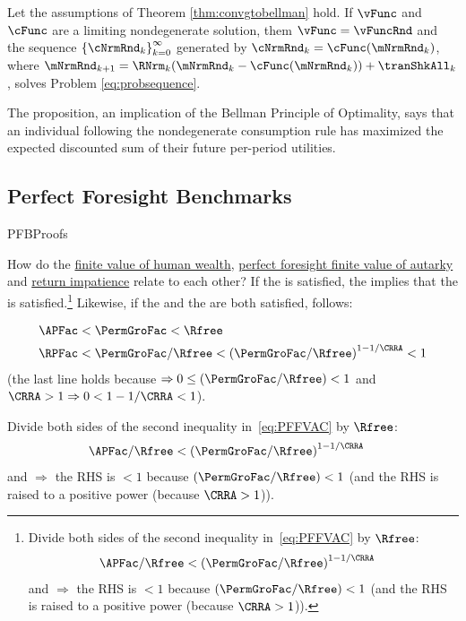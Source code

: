 \documentclass[\econtexRoot/BufferStockTheory]{subfiles}
\begin{document}
\begin{proposition}
Let the assumptions of Theorem \ref{thm:convgtobellman} hold. If $\vFunc$ and $\cFunc$ are a limiting nondegenerate solution, them $\vFunc= \vFuncRnd$ and the sequence $\left\{\cNrmRnd_{k}\right\}_{k=0}^{\infty}$ generated by  $\cNrmRnd_{k} = \cFunc(\mNrmRnd_{k})$, where $\mNrmRnd_{k+1} = \RNrm_{k}(\mNrmRnd_{k} -  \cFunc(\mNrmRnd_{k})) + \tranShkAll_{k}$, solves Problem \eqref{eq:probsequence}. 
\end{proposition}

The proposition, an implication of the Bellman Principle of Optimality, says that an individual following the nondegenerate consumption rule has maximized the expected discounted sum of their future per-period utilities.


\subsection{Perfect Foresight Benchmarks}\label{sec:PFBProofs}\hypertarget{}{PFBProofs}


How do the \hyperlink{FHWC}{finite value of human wealth}, \hyperlink{PFFVAC}{perfect foresight finite value of autarky} and \hyperlink{RIC}{return impatience} relate to each other? If the {\FHWC} is satisfied, the {\PFFVAC} implies that the {\RIC} is satisfied.\footnote{Divide both sides of the second inequality in~\eqref{eq:PFFVAC} by $\Rfree$:
%
%
  \begin{align*}
    \APFac/\Rfree & < {(\PermGroFac/\Rfree)}^{1-1/\CRRA}  \label{eq:FHWCandPFFVACimplyRIC}
  \end{align*}
  and {\FHWC} $\Rightarrow$ the RHS is $< 1$ because $(\PermGroFac/\Rfree) < 1$ (and the RHS is raised to a positive power (because $\CRRA>1$)).}  Likewise, if the {\FHWC} and the {\GICRaw} are both satisfied, {\PFFVAC} follows:
  
\begin{equation}\label{eq:GICandFHWCimplyPFFVAC}
  \begin{split}
    \APFac & < \PermGroFac < \Rfree
    \\   \RPFac & < \PermGroFac/\Rfree < {(\PermGroFac/\Rfree)}^{1-1/\CRRA} < 1
  \end{split}
\end{equation}
(the last line holds because {\FHWC} $\Rightarrow 0 \leq (\PermGroFac/\Rfree) < 1$ and $\CRRA > 1 \Rightarrow 0 < 1-1/\CRRA < 1$).

Divide both sides of the second inequality in~\eqref{eq:PFFVAC} by $\Rfree$:
  \begin{align}
    \APFac/\Rfree & < {(\PermGroFac/\Rfree)}^{1-1/\CRRA}  \label{eq:FHWCandPFFVACimplyRIC}
  \end{align}
  and {\FHWC} $\Rightarrow$ the RHS is $< 1$ because $(\PermGroFac/\Rfree) < 1$ (and the RHS is raised to a positive power (because $\CRRA>1$)).
\end{document}
